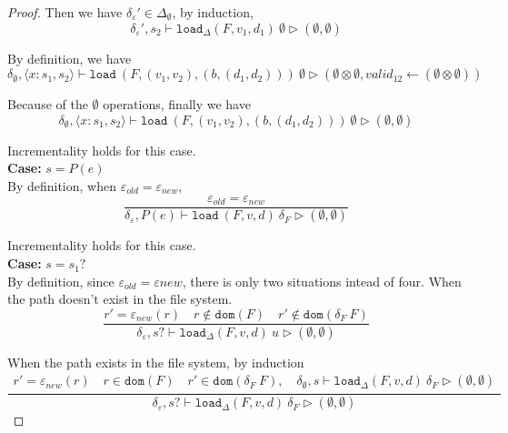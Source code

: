 \documentclass[10pt,twoside,a4paper]{article}
\theoremstyle{theorem}
\theoremstyle{lemma}
\theoremstyle{property}
\theoremstyle{definition}
\theoremstyle{assumption}
\begin{document}
\begin{proof}
	Then we have $\delta_\varepsilon' \in \Delta_{\emptyset}$, by induction, 
	\begin{displaymath}
		\delta_\varepsilon', s_2 \vdash \mathtt{load}_\Delta (F,v_1,d_1)~ \emptyset \rhd (\emptyset,\emptyset)
	\end{displaymath}

	By definition, we have
	\begin{displaymath}
		\delta_{\emptyset}, \langle x:s_1,s_2 \rangle \vdash \mathtt{load}~ (F,(v_1,v_2),(b,(d_1,d_2)))~ \emptyset \rhd (\emptyset \otimes \emptyset,valid_{12} \leftarrow (\emptyset \otimes \emptyset)) 
	\end{displaymath}

	Because of the $\emptyset$ operations, finally we have
	\begin{displaymath}
		\delta_{\emptyset}, \langle x:s_1,s_2 \rangle \vdash \mathtt{load}~ (F,(v_1,v_2),(b,(d_1,d_2)))~ \emptyset \rhd (\emptyset, \emptyset) 
	\end{displaymath}

	Incrementality holds for this case.\\

	\textbf{Case: } $s = P(e)$\\

		By definition, when $\varepsilon_{old} = \varepsilon_{new}$,
		\begin{displaymath}
			\frac{ \varepsilon_{old} = \varepsilon_{new}}
			{\delta_\varepsilon, P(e) \vdash \mathtt{load}~ (F,v,d) ~\delta_F \rhd (\emptyset, \emptyset)}
		\end{displaymath}

		Incrementality holds for this case.\\

	\textbf{Case: } $s = s_1?$\\

	By definition, since $\varepsilon_{old} = \varepsilon{new}$, there is only two situations intead of four. When the path doesn't exist in the file system.
	\begin{displaymath}
	\frac{
		r' = \varepsilon_{new}(r) \quad r \notin \mathtt{dom}(F) \quad r' \notin \mathtt{dom}(\delta_F~F)
	}
	{\delta_\varepsilon, s? \vdash \mathtt{load}_\Delta (F,v,d)~ u \rhd (\emptyset, \emptyset)}
	\end{displaymath}

	When the path exists in the file system, by induction
	\begin{displaymath}
	\frac{\begin{array}{c}
	r' = \varepsilon_{new}(r) \quad r \in \mathtt{dom}(F) \quad r' \in \mathtt{dom}(\delta_F~F), \quad
		\delta_{\emptyset}, s \vdash \mathtt{load}_\Delta (F,v,d)~ \delta_F \rhd (\emptyset, \emptyset)
	\end{array}}
	{\delta_\varepsilon, s? \vdash \mathtt{load}_\Delta (F,v,d)~ \delta_F \rhd (\emptyset,\emptyset)}
	\end{displaymath}


\end{proof}
\end{document}
